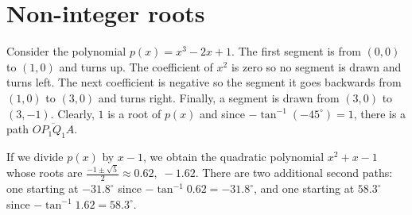 \newpage

\section{Non-integer roots}\label{s.noninteger}

Consider the polynomial $p(x)=x^3-2x+1$. The first segment is from $(0,0)$ to $(1,0)$ and turns up. The coefficient of $x^2$ is zero so no segment is drawn and turns left. The next coefficient is negative so the segment it goes backwards from $(1,0)$ to $(3,0)$ and turns right. Finally, a segment is drawn from $(3,0)$ to $(3,-1)$. Clearly, $1$ is a root of $p(x)$ and since $-\tan^{-1} (-45^\circ)=1$, there is a path $\overline{OP_1Q_1A}$.

 If we divide $p(x)$ by $x-1$, we obtain the quadratic polynomial $x^2+x-1$ whose roots are $\frac{-1\pm\sqrt{5}}{2} \approx 0.62,\; -1.62$.
There are two additional second paths: one starting at $-31.8^\circ$ since $-\tan^{-1} 0.62=-31.8^\circ$, and one starting at $58.3^\circ$ since $-\tan^{-1}1.62=58.3^\circ$.

